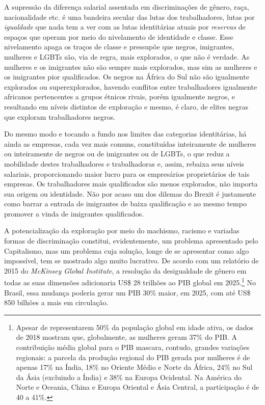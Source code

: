 A supressão da diferença salarial assentada em discriminações de gênero,
raça, nacionalidade etc. é uma bandeira secular das lutas dos
trabalhadores, lutas por \emph{igualdade} que nada tem a ver com as
lutas identitárias atuais por \emph{reservas} de espaços que operam por
meio do nivelamento de identidade e classe. Esse nivelamento apaga os
traços de classe e pressupõe que negros, imigrantes, mulheres e LGBTs
são, via de regra, mais explorados, o que não é verdade. As mulheres e
os imigrantes não são sempre mais explorados, mas sim as mulheres e os
imigrantes pior qualificados. Os negros na África do Sul não são
igualmente explorados ou superexplorados, havendo conflitos entre
trabalhadores igualmente africanos pertencentes a grupos étnicos rivais,
porém igualmente negros, e resultando em níveis distintos de exploração
e mesmo, é claro, de elites negras que exploram trabalhadores negros.

Do mesmo modo e tocando a fundo nos limites das categorias identitárias,
há ainda as empresas, cada vez mais comuns, constituídas inteiramente de
mulheres ou inteiramente de negros ou de imigrantes ou de LGBTs, o que
reduz a mobilidade destes trabalhadores e trabalhadoras e, assim,
rebaixa seus níveis salariais, proporcionando maior lucro para os
empresários proprietários de tais empresas. Os trabalhadores mais
qualificados são menos explorados, não importa sua origem ou identidade.
Não por acaso um dos dilemas do Brexit é justamente como barrar a
entrada de imigrantes de baixa qualificação e ao mesmo tempo promover a
vinda de imigrantes qualificados.

A potencialização da exploração por meio do machismo, racismo e variadas
formas de discriminação constitui, evidentemente, um problema
apresentado pelo Capitalismo, mas um problema cuja solução, longe de se
apresentar como algo impossível, tem se mostrado algo muito lucrativo.
De acordo com um relatório de 2015 do \emph{McKinsey Global Institute},
a resolução da desigualdade de gênero em todas as suas dimensões
adicionaria US\$ 28 trilhões ao PIB global em 2025.\footnote{Apesar de
  representarem 50\% da população global em idade ativa, os dados de
  2018 mostram que, globalmente, as mulheres geram 37\% do PIB. A
  contribuição média global para o PIB mascara, contudo, grandes
  variações regionais: a parcela da produção regional do PIB gerada por
  mulheres é de apenas 17\% na Índia, 18\% no Oriente Médio e Norte da
  África, 24\% no Sul da Ásia (excluindo a Índia) e 38\% na Europa
  Ocidental. Na América do Norte e Oceania, China e Europa Oriental e
  Ásia Central, a participação é de 40 a 41\%.} No Brasil, essa mudança
poderia gerar um PIB 30\% maior, em 2025, com até US\$ 850 bilhões a
mais em circulação.

